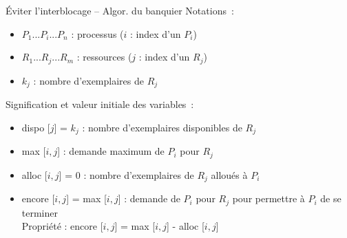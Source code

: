 \begin {frame} {Éviter l'interblocage -- Algor. du banquier}
    Notations~:
    \begin {itemize}
	\item $P_1 ... P_i ... P_n$ : processus ($i$ : index d'un $P_i$)
	\item $R_1 ... R_j ... R_m$ : ressources ($j$ : index d'un $R_j$)
	\item $k_j$ : nombre d'exemplaires de $R_j$
    \end {itemize}

    \vspace* {3mm}

    Signification et valeur initiale des variables~:

    \begin {itemize}
	\item dispo [$j$] = $k_j$ : nombre d'exemplaires disponibles de $R_j$
	\item max [$i, j$] : demande maximum de $P_i$ pour $R_j$
	\item alloc [$i, j$] = 0 : nombre d'exemplaires de $R_j$ alloués à $P_i$
	\item encore [$i,j$] = max [$i, j$] : demande de $P_i$ pour $R_j$ pour
	    permettre à $P_i$ de se terminer
	    \\
	    Propriété : encore [$i,j$] = max [$i, j$] - alloc [$i, j$] 
    \end {itemize}
\end {frame}

